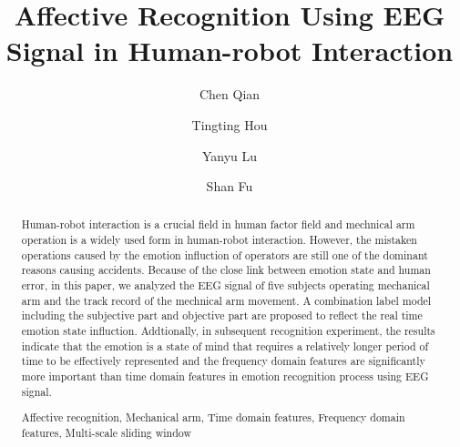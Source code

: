 \documentclass[runningheads,a4paper]{llncs}
\newcommand{\keywords}[1]{\par\addvspace\baselineskip
\noindent\keywordname\enspace\ignorespaces#1}
\begin{document}
\mainmatter

\title{ Affective Recognition Using EEG Signal in Human-robot Interaction }

\author{Chen Qian\and Tingting Hou\and Yanyu Lu \and Shan Fu }


\maketitle
\begin{abstract}
Human-robot interaction is a crucial field in human factor field and mechnical
arm operation is a widely used form in human-robot interaction.
However, the mistaken operations caused by the emotion influction
of operators are still one of the dominant reasons causing accidents. Because of
the close link between emotion state and human error, in this paper, we analyzed
the EEG signal of five subjects operating mechanical arm and the track record of
the mechnical arm movement. A combination label model including the subjective part and
objective part are proposed to reflect the real time emotion state influction. Addtionally,
in subsequent recognition experiment, the results indicate that the emotion is
a state of mind that requires a relatively longer period of time to be effectively represented
and the frequency domain features are significantly more important than time domain features
in emotion recognition process using EEG signal.
\keywords{Affective recognition, Mechanical arm, Time domain features,
Frequency domain features, Multi-scale sliding window}
\end{abstract}
\end{document}
